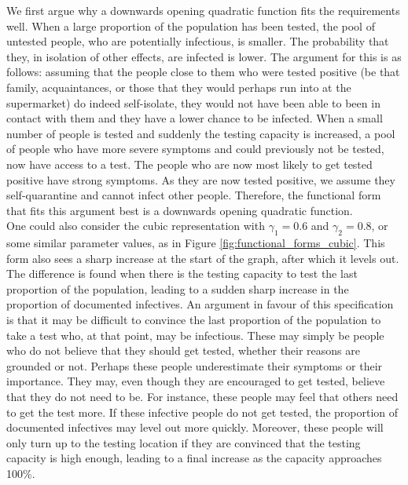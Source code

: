 \documentclass[12pt]{article}
\begin{document}
    
    We first argue why a downwards opening quadratic function fits the requirements well. When a large proportion of the population has been tested, the pool of untested people, who are potentially infectious, is smaller. The probability that they, in isolation of other effects, are infected is lower. The argument for this is as follows: assuming that the people close to them who were tested positive (be that family, acquaintances, or those that they would perhaps run into at the supermarket) do indeed self-isolate, they would not have been able to been in contact with them and they have a lower chance to be infected. When a small number of people is tested and suddenly the testing capacity is increased, a pool of people who have more severe symptoms and could previously not be tested, now have access to a test. The people who are now most likely to get tested positive have strong symptoms. As they are now tested positive, we assume they self-quarantine and cannot infect other people. Therefore, the functional form that fits this argument best is a downwards opening quadratic function.
    \\
    
    One could also consider the cubic representation with $\gamma_1=0.6$ and $\gamma_2=0.8$, or some similar parameter values, as in Figure \ref{fig:functional_forms_cubic}. This form also sees a sharp increase at the start of the graph, after which it levels out. The difference is found when there is the testing capacity to test the last proportion of the population, leading to a sudden sharp increase in the proportion of documented infectives. An argument in favour of this specification is that it may be difficult to convince the last proportion of the population to take a test who, at that point, may be infectious. These may simply be people who do not believe that they should get tested, whether their reasons are grounded or not. Perhaps these people underestimate their symptoms or their importance. They may, even though they are encouraged to get tested, believe that they do not need to be. For instance, these people may feel that others need to get the test more. If these infective people do not get tested, the proportion of documented infectives may level out more quickly. Moreover, these people will only turn up to the testing location if they are convinced that the testing capacity is high enough, leading to a final increase as the capacity approaches 100\%.
    \\
    
\end{document}
